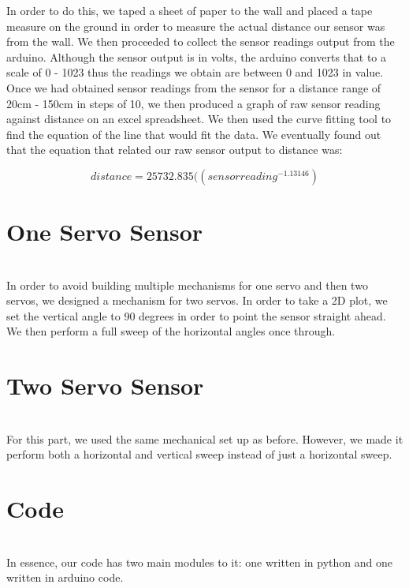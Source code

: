 \documentclass{article}
\begin{document}
In order to do this, we taped a sheet of paper to the wall and placed a tape measure on the ground in order to measure the actual distance our sensor was from the wall. We then proceeded to collect the sensor readings output from the arduino. Although the sensor output is in volts, the arduino converts that to a scale of 0 - 1023 thus the readings we obtain are between 0 and 1023 in value. \\

Once we had obtained sensor readings from the sensor for a distance range of 20cm - 150cm in steps of 10, we then produced a graph of raw sensor reading against distance on an excel spreadsheet. We then used the curve fitting tool to find the equation of the line that would fit the data. We eventually found out that the equation that related our raw sensor output to distance was:

\begin{equation}
distance=25732.835((sensor reading^{-1.13146})
\end{equation}

\newpage

\section{One Servo Sensor} \ \\

In order to avoid building multiple mechanisms for one servo and then two servos, we designed a mechanism for two servos. In order to take a 2D plot, we set the vertical angle to 90 degrees in order to point the sensor straight ahead. We then perform a full sweep of the horizontal angles once through. 

\section{Two Servo Sensor} \ \\

For this part, we used the same mechanical set up as before. However, we made it perform both a horizontal and vertical sweep instead of just a horizontal sweep.

\section{Code} \ \\
In essence, our code has two main modules to it: one written in python and one written in arduino code. \\
\end{document}
